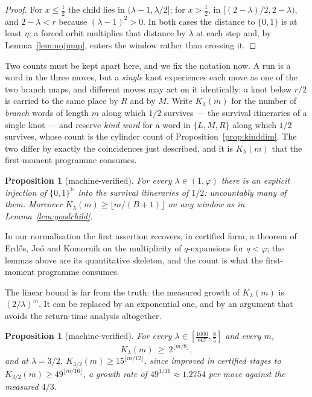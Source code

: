 \documentclass[11pt,reqno]{amsart}
\theoremstyle{plain}
\newtheorem{proposition}[theorem]{Proposition}
\theoremstyle{definition}
\theoremstyle{remark}
\begin{document}
\begin{proof}
For $x\leq\tfrac12$ the child lies in $(\lambda-1,\lambda/2]$; for
$x>\tfrac12$, in $[(2-\lambda)/2,2-\lambda)$, and $2-\lambda<r$ because
$(\lambda-1)^2>0$. In both cases the distance to $\{0,1\}$ is at least
$\eta$; a forced orbit multiplies that distance by $\lambda$ at each step and,
by Lemma~\ref{lem:nojump}, enters the window rather than crossing it.
\end{proof}

Two counts must be kept apart here, and we fix the notation now. A run is a
word in the three moves, but a \emph{single} knot experiences each move as one
of the two branch maps, and different moves may act on it identically: a knot
below $r/2$ is carried to the same place by $R$ and by $M$. Write
$K_\lambda(m)$ for the number of \emph{branch} words of length $m$ along which
$1/2$ survives --- the survival itineraries of a single knot --- and reserve
\emph{kind word} for a word in $\{L,M,R\}$ along which $1/2$ survives, whose
count is the cylinder count of Proposition~\ref{prop:kinddim}. The two differ
by exactly the coincidences just described, and it is $K_\lambda(m)$ that the
first-moment programme consumes.

\begin{proposition}[machine-verified]\label{prop:continuum}
For every $\lambda\in(1,\varphi)$ there is an explicit injection of
$\{0,1\}^{\mathbb N}$ into the survival itineraries of $1/2$: uncountably many
of them. Moreover $K_\lambda(m)\geq\lfloor m/(B+1)\rfloor$ on any window as in
Lemma~\ref{lem:goodchild}.
\end{proposition}

In our normalisation the first assertion recovers, in certified form, a
theorem of Erd\H{o}s, Jo\'o and Komornik \cite{ErdosJooKomornik1990} on the
multiplicity of $q$-expansions for $q<\varphi$; the lemmas above are its
quantitative skeleton, and the count is what the first-moment programme
consumes.

The linear bound is far from the truth: the measured growth of $K_\lambda(m)$
is $(2/\lambda)^m$. It can be replaced by an exponential one, and by an
argument that avoids the return-time analysis altogether.

\begin{proposition}[machine-verified]\label{prop:expcount}
For every $\lambda\in[\tfrac{1000}{667},\tfrac85]$ and every $m$,
\[
  K_\lambda(m)\ \geq\ 2^{\lfloor m/8\rfloor},
\]
and at $\lambda=3/2$, $K_{3/2}(m)\geq15^{\lfloor m/12\rfloor}$, since improved
in certified stages to $K_{3/2}(m)\geq49^{\lfloor m/16\rfloor}$, a growth rate
of $49^{1/16}\approx1.2754$ per move against the measured $4/3$.
\end{proposition}
\end{document}
